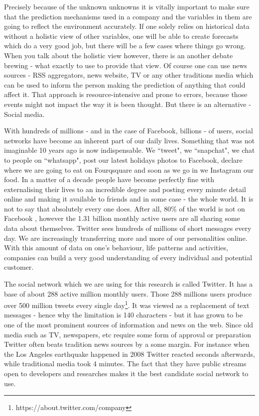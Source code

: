 \documentclass[minf,twoside,singlespacing,parskip,frontabs,notimes,12pt]{infthesis} %
\begin{document}
Precisely because of the unknown unknowns it is vitally important to make sure that the prediction mechanisms used in a company and the variables in them are going to reflect the environment accurately. If one solely relies on historical data without a holistic view of other variables, one will be able to create forecasts which do a very good job, but there will be a few cases where things go wrong. When you talk about the holistic view however, there is an another debate brewing - what exactly to use to provide that view. Of course one can use news sources - RSS aggregators, news website, TV or any other traditions media which can be used to inform the person making the prediction of anything that could affect it. That approach is resource-intensive and prone to errors, because those events might not impact the way it is been thought. But there is an alternative - Social media. 

With hundreds of millions - and in the case of Facebook, billions - of users, social networks have become an inherent part of our daily lives. Something that was not imaginable 10 years ago is now indispensable. We ``tweet", we ``snapchat", we chat to people on ``whatsapp", post our latest holidays photos to Facebook, declare where we are going to eat on Fourqsquare and soon as we go in we Instagram our food. In a matter of a decade people have become perfectly fine with externalising their lives to an incredible degree and posting every minute detail online and making it available to friends and in some case - the whole world. It is not to say that absolutely every one does. After all, 80\% of the world is not on Facebook \cite{FBstats}, however the 1.31 billion monthly active users are all sharing some data about themselves. Twitter sees hundreds of millions of short messages every day. We are increasingly transferring more and more of our personalities online. With this amount of data on one's behaviour, life patterns and activities, companies can build a very good understanding of every individual and potential customer.

The social network which we are using for this research is called Twitter. It has a base of about 288 active million monthly users. Those 288 millions users produce over 500 million tweets every single day\footnote{https://about.twitter.com/company}. It was viewed as a replacement of text messages - hence why the limitation is 140 characters - but it has grown to be one of the most prominent sources of information and news on the web. Since old media such as TV, newspapers, etc require some form of approval or preparation Twitter often beats tradition news sources by a some margin. For instance when the Los Angeles earthquake happened in 2008 \cite{TwitterNewsWire} Twitter reacted seconds afterwards, while traditional media took 4 minutes. The fact that they have public streams open to developers and researches makes it the best candidate social network to use. 
\end{document}
